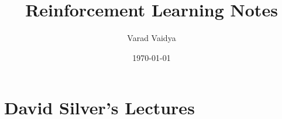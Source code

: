 \documentclass[working,a4paper]{article}
\title{Reinforcement Learning Notes}
\author{Varad Vaidya}
\date{\today}
\begin{document}
  \createintro

\part{David Silver's Lectures}
  
  
  \clearpage
  
  \clearpage
  
  \clearpage
  
  \clearpage
  
  \clearpage
  

  
\end{document}
